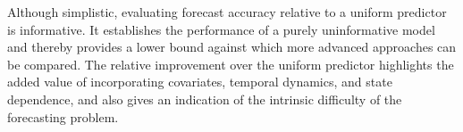 \documentclass{article}
\begin{document}
Although simplistic, evaluating forecast accuracy relative to a uniform predictor is informative. It establishes the performance of a purely uninformative model and thereby provides a lower bound against which more advanced approaches can be compared. The relative improvement over the uniform predictor highlights the added value of incorporating covariates, temporal dynamics, and state dependence, and also gives an indication of the intrinsic difficulty of the forecasting problem.

\end{document}
